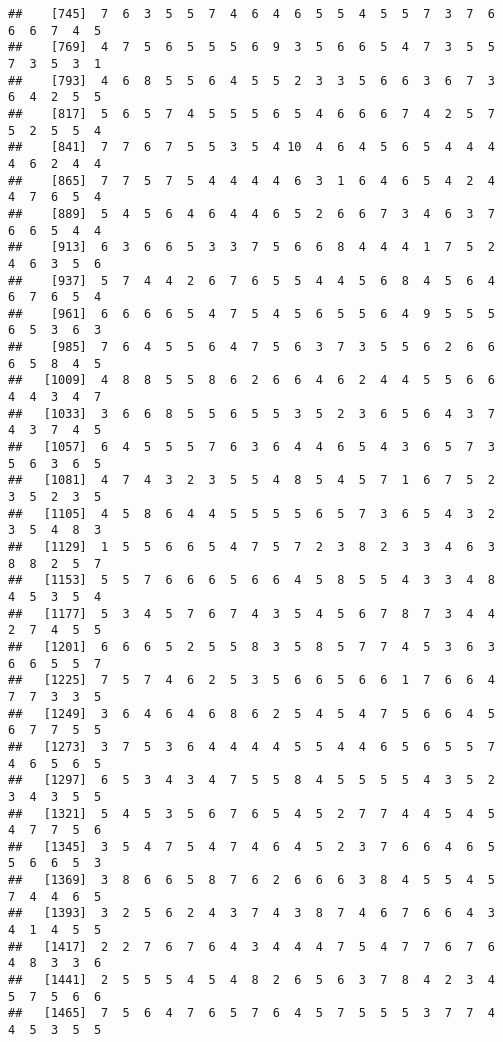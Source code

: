 \documentclass[
]{book}
\begin{document}
\begin{verbatim}
##    [745]  7  6  3  5  5  7  4  6  4  6  5  5  4  5  5  7  3  7  6  6  6  7  4  5
##    [769]  4  7  5  6  5  5  5  6  9  3  5  6  6  5  4  7  3  5  5  7  3  5  3  1
##    [793]  4  6  8  5  5  6  4  5  5  2  3  3  5  6  6  3  6  7  3  6  4  2  5  5
##    [817]  5  6  5  7  4  5  5  5  6  5  4  6  6  6  7  4  2  5  7  5  2  5  5  4
##    [841]  7  7  6  7  5  5  3  5  4 10  4  6  4  5  6  5  4  4  4  4  6  2  4  4
##    [865]  7  7  5  7  5  4  4  4  4  6  3  1  6  4  6  5  4  2  4  4  7  6  5  4
##    [889]  5  4  5  6  4  6  4  4  6  5  2  6  6  7  3  4  6  3  7  6  6  5  4  4
##    [913]  6  3  6  6  5  3  3  7  5  6  6  8  4  4  4  1  7  5  2  4  6  3  5  6
##    [937]  5  7  4  4  2  6  7  6  5  5  4  4  5  6  8  4  5  6  4  6  7  6  5  4
##    [961]  6  6  6  6  5  4  7  5  4  5  6  5  5  6  4  9  5  5  5  6  5  3  6  3
##    [985]  7  6  4  5  5  6  4  7  5  6  3  7  3  5  5  6  2  6  6  6  5  8  4  5
##   [1009]  4  8  8  5  5  8  6  2  6  6  4  6  2  4  4  5  5  6  6  4  4  3  4  7
##   [1033]  3  6  6  8  5  5  6  5  5  3  5  2  3  6  5  6  4  3  7  4  3  7  4  5
##   [1057]  6  4  5  5  5  7  6  3  6  4  4  6  5  4  3  6  5  7  3  5  6  3  6  5
##   [1081]  4  7  4  3  2  3  5  5  4  8  5  4  5  7  1  6  7  5  2  3  5  2  3  5
##   [1105]  4  5  8  6  4  4  5  5  5  5  6  5  7  3  6  5  4  3  2  3  5  4  8  3
##   [1129]  1  5  5  6  6  5  4  7  5  7  2  3  8  2  3  3  4  6  3  8  8  2  5  7
##   [1153]  5  5  7  6  6  6  5  6  6  4  5  8  5  5  4  3  3  4  8  4  5  3  5  4
##   [1177]  5  3  4  5  7  6  7  4  3  5  4  5  6  7  8  7  3  4  4  2  7  4  5  5
##   [1201]  6  6  6  5  2  5  5  8  3  5  8  5  7  7  4  5  3  6  3  6  6  5  5  7
##   [1225]  7  5  7  4  6  2  5  3  5  6  6  5  6  6  1  7  6  6  4  7  7  3  3  5
##   [1249]  3  6  4  6  4  6  8  6  2  5  4  5  4  7  5  6  6  4  5  6  7  7  5  5
##   [1273]  3  7  5  3  6  4  4  4  4  5  5  4  4  6  5  6  5  5  7  4  6  5  6  5
##   [1297]  6  5  3  4  3  4  7  5  5  8  4  5  5  5  5  4  3  5  2  3  4  3  5  5
##   [1321]  5  4  5  3  5  6  7  6  5  4  5  2  7  7  4  4  5  4  5  4  7  7  5  6
##   [1345]  3  5  4  7  5  4  7  4  6  4  5  2  3  7  6  6  4  6  5  5  6  6  5  3
##   [1369]  3  8  6  6  5  8  7  6  2  6  6  6  3  8  4  5  5  4  5  7  4  4  6  5
##   [1393]  3  2  5  6  2  4  3  7  4  3  8  7  4  6  7  6  6  4  3  4  1  4  5  5
##   [1417]  2  2  7  6  7  6  4  3  4  4  4  7  5  4  7  7  6  7  6  4  8  3  3  6
##   [1441]  2  5  5  5  4  5  4  8  2  6  5  6  3  7  8  4  2  3  4  5  7  5  6  6
##   [1465]  7  5  6  4  7  6  5  7  6  4  5  7  5  5  5  3  7  7  4  4  5  3  5  5

\end{verbatim}
\end{document}
